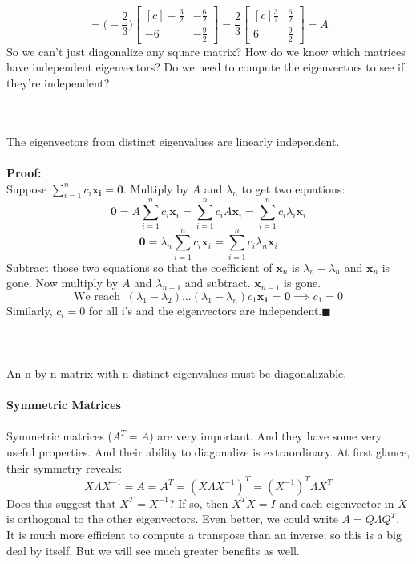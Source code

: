 \documentclass{tufte-handout}
\renewcommand{\qedsymbol}{$\blacksquare$}
\begin{document}
\[
=
\Big(-\frac{2}{3}\Big)
\begin{bmatrix*}[c] -\frac{3}{2}&-\frac{6}{2}\\-6&-\frac{9}{2} \end{bmatrix*}
=
\frac{2}{3}
\begin{bmatrix*}[c] \frac{3}{2}&\frac{6}{2}\\6&\frac{9}{2} \end{bmatrix*}
=A
\]
\[\]
\noindent So we can't just diagonalize any square matrix? How do we know which matrices have independent eigenvectors? Do we need to compute the eigenvectors to see if they're independent?\\\leavevmode

\\\leavevmode\\
\noindent The eigenvectors from distinct eigenvalues are linearly independent.\\\leavevmode\\
\noindent\textbf{Proof:}\\
\noindent Suppose $\sum_{i=1}^{n}c_i\mathbf{x_i}=\mathbf{0}$. Multiply by $A$ and $\lambda_n$ to get two equations:
\[
\mathbf{0}=A\sum_{i=1}^{n}c_i\mathbf{x}_i
=\sum_{i=1}^{n}c_iA\mathbf{x}_i
=\sum_{i=1}^{n}c_i\lambda_i\mathbf{x}_i
\]
\[
\mathbf{0}=\lambda_n\sum_{i=1}^{n}c_i\mathbf{x}_i
=\sum_{i=1}^{n}c_i\lambda_n\mathbf{x}_i
\]
Subtract those two equations so that the coefficient of $\mathbf{x}_n$ is $\lambda_n-\lambda_n$ and $\mathbf{x}_n$ is gone. Now multiply by $A$ and $\lambda_{n-1}$ and subtract. $\mathbf{x}_{n-1}$ is gone.
\[
\text{We reach }~
(\lambda_1-\lambda_2)...(\lambda_1-\lambda_n)c_1\mathbf{x_1}=\mathbf{0}
\implies
c_1=0
\]
Similarly, $c_i=0$ for all i's and the eigenvectors are independent.\quad \qedsymbol\\\leavevmode\\

\\\leavevmode\\
\noindent An n by n matrix with n distinct eigenvalues must be diagonalizable.\\\leavevmode\\

\[\]
{\Large\textbf{Symmetric Matrices}}\\\leavevmode\\
\noindent Symmetric matrices ($A^T=A$) are very important. And they have some very useful properties. And their ability to diagonalize is extraordinary. At first glance, their symmetry reveals:
\[
X\Lambda X^{-1}=A=A^T=(X\Lambda X^{-1})^T=(X^{-1})^T\Lambda X^T
\]
Does this suggest that $X^T=X^{-1}$? If so, then $X^TX=I$ and each eigenvector in $X$ is orthogonal to the other eigenvectors. Even better, we could write $A=Q\Lambda Q^T$. It is much more efficient to compute a transpose than an inverse; so this is a big deal by itself. But we will see much greater benefits as well.
\end{document}
